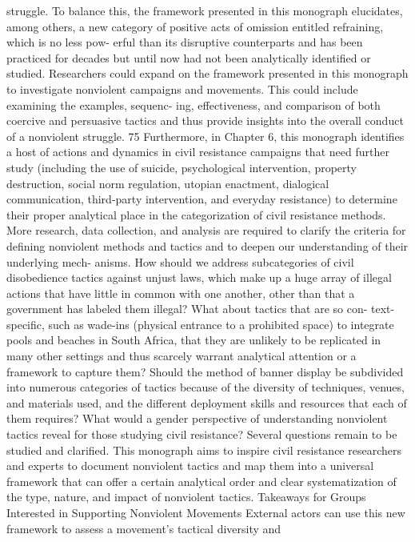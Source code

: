 \documentclass[twoside,a4paper,12pt,fleqn,openany]{extbook}
\begin{document}
struggle. To balance this, the framework presented in this monograph elucidates, among
others, a new category of positive acts of omission entitled refraining, which is no less pow-
erful than its disruptive counterparts and has been practiced for decades but until now had
not been analytically identified or studied.
Researchers could expand on the framework presented in this monograph to investigate
nonviolent campaigns and movements. This could include examining the examples, sequenc-
ing, effectiveness, and comparison of both coercive and persuasive tactics and thus provide
insights into the overall conduct of a nonviolent struggle.
75
Furthermore, in Chapter 6, this monograph identifies a host of actions and dynamics in
civil resistance campaigns that need further study (including the use of suicide, psychological
intervention, property destruction, social norm regulation, utopian enactment, dialogical
communication, third-party intervention, and everyday resistance) to determine their proper
analytical place in the categorization of civil resistance methods.
More research, data collection, and analysis are required to clarify the criteria for defining
nonviolent methods and tactics and to deepen our understanding of their underlying mech-
anisms. How should we address subcategories of civil disobedience tactics against unjust
laws, which make up a huge array of illegal actions that have little in common with one another,
other than that a government has labeled them illegal? What about tactics that are so con-
text- specific, such as wade-ins (physical entrance to a prohibited space) to integrate pools
and beaches in South Africa, that they are unlikely to be replicated in many other settings
and thus scarcely warrant analytical attention or a framework to capture them? Should the
method of banner display be subdivided into numerous categories of tactics because of the
diversity of techniques, venues, and materials used, and the different deployment skills and
resources that each of them requires? What would a gender perspective of understanding
nonviolent tactics reveal for those studying civil resistance? Several questions remain to be
studied and clarified.
This monograph aims to inspire civil resistance researchers and experts to document
nonviolent tactics and map them into a universal framework that can offer a certain analytical
order and clear systematization of the type, nature, and impact of nonviolent tactics.
Takeaways for Groups Interested in Supporting Nonviolent Movements
External actors can use this new framework to assess a movement’s tactical diversity and
\end{document}
